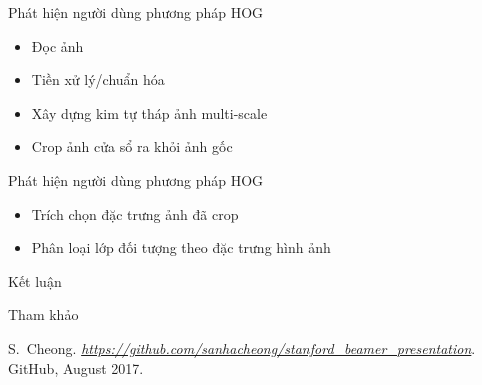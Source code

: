 \documentclass[pdf]{beamer}
\newcommand{\empr}[1]{{\color{cardinalred}\emph{#1}}}
\theoremstyle{remark}
\theoremstyle{definition}
\begin{document}
\begin{frame}{Phát hiện người dùng phương pháp HOG}
	\begin{itemize}
		\item Đọc ảnh
		\item Tiền xử lý/chuẩn hóa
		\item Xây dựng kim tự tháp ảnh multi-scale
		\item Crop ảnh cửa sổ ra khỏi ảnh gốc
	\end{itemize}
\end{frame}

\begin{frame}{Phát hiện người dùng phương pháp HOG}
	\begin{itemize}
		\item Trích chọn đặc trưng ảnh đã crop
		\item Phân loại lớp đối tượng theo đặc trưng hình ảnh
	\end{itemize}
\end{frame}

\begin{frame}{Kết luận}
	
\end{frame}

\begin{frame}{Tham khảo}
\begin{thebibliography}{3}
	S.~Cheong. \empr{\href{https://github.com/sanhacheong/stanford_beamer_template}{https://github.com/sanhacheong/stanford\_beamer\_presentation}}. {GitHub}, August 2017.
\end{thebibliography}
\end{frame}
\end{document}
